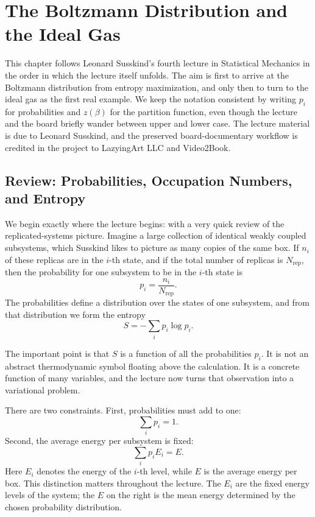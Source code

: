\chapter{The Boltzmann Distribution and the Ideal Gas}

This chapter follows Leonard Susskind's fourth lecture in Statistical Mechanics in the order in which the lecture itself unfolds. The aim is first to arrive at the Boltzmann distribution from entropy maximization, and only then to turn to the ideal gas as the first real example. We keep the notation consistent by writing \(p_i\) for probabilities and \(z(\beta)\) for the partition function, even though the lecture and the board briefly wander between upper and lower case. The lecture material is due to Leonard Susskind, and the preserved board-documentary workflow is credited in the project to LazyingArt LLC and Video2Book.

\section{Review: Probabilities, Occupation Numbers, and Entropy}

We begin exactly where the lecture begins: with a very quick review of the replicated-systems picture. Imagine a large collection of identical weakly coupled subsystems, which Susskind likes to picture as many copies of the same box. If \(n_i\) of these replicas are in the \(i\)-th state, and if the total number of replicas is \(N_{\mathrm{rep}}\), then the probability for one subsystem to be in the \(i\)-th state is
\begin{equation}
p_i=\frac{n_i}{N_{\mathrm{rep}}}.
\end{equation}
The probabilities define a distribution over the states of one subsystem, and from that distribution we form the entropy
\begin{equation}
S=-\sum_i p_i \log p_i.
\end{equation}

The important point is that \(S\) is a function of all the probabilities \(p_i\). It is not an abstract thermodynamic symbol floating above the calculation. It is a concrete function of many variables, and the lecture now turns that observation into a variational problem.

There are two constraints. First, probabilities must add to one:
\begin{equation}
\sum_i p_i=1.
\end{equation}
Second, the average energy per subsystem is fixed:
\begin{equation}
\sum_i p_i E_i = E.
\end{equation}
Here \(E_i\) denotes the energy of the \(i\)-th level, while \(E\) is the average energy per box. This distinction matters throughout the lecture. The \(E_i\) are the fixed energy levels of the system; the \(E\) on the right is the mean energy determined by the chosen probability distribution.

